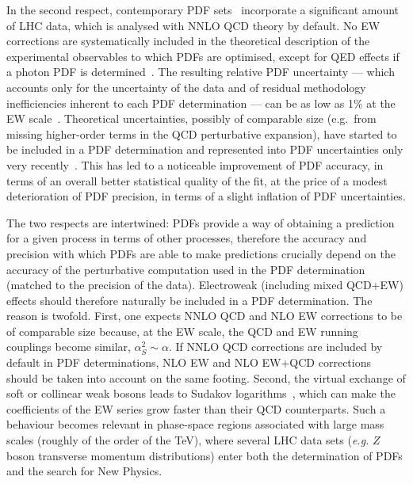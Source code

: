 In the second respect, contemporary PDF
sets~\cite{Harland-Lang:2014zoa,Ball:2017nwa,Hou:2019efy}
incorporate a significant amount of LHC data, which is analysed with NNLO QCD 
theory by default. No EW corrections are systematically included in the 
theoretical description of the experimental observables to which PDFs are 
optimised, except for QED effects if a photon PDF is 
determined~\cite{Schmidt:2015zda,Bertone:2017bme,Harland-Lang:2019pla}. 
The resulting relative PDF uncertainty --- which accounts only for the
uncertainty of the data and of residual methodology inefficiencies inherent to 
each PDF determination --- can be as low as 1\% at the EW 
scale~\cite{Ball:2017nwa}. Theoretical uncertainties, possibly of comparable 
size (e.g.\ from missing higher-order terms in the QCD perturbative
expansion), have started to be included in a PDF determination and represented 
into PDF uncertainties only very 
recently~\cite{AbdulKhalek:2019bux,AbdulKhalek:2019ihb}. This has led to a 
noticeable improvement of PDF accuracy, in terms of an overall
better statistical quality of the fit, at the price of a modest deterioration 
of PDF precision, in terms of a slight inflation of PDF uncertainties.

The two respects are intertwined: PDFs provide a way of obtaining a prediction
for a given process in terms of other processes, therefore the accuracy and 
precision with which PDFs are able to make predictions crucially depend on 
the accuracy of the perturbative computation used in the PDF determination
(matched to the precision of the data). Electroweak (including mixed QCD+EW) 
effects should therefore naturally be included in a PDF determination. The 
reason is twofold. First, one expects NNLO QCD and NLO EW corrections to be of 
comparable size because, at the EW scale, the QCD and EW running couplings 
become similar, $\alpha_S^2\sim \alpha$. If NNLO QCD corrections are included 
by default in PDF determinations, NLO EW and NLO EW+QCD corrections should be 
taken into account on the same footing. Second, the virtual exchange of soft or 
collinear weak bosons leads to Sudakov 
logarithms~\cite{Denner:2000jv,Denner:2001gw},
which can make the coefficients of the EW series grow faster than 
their QCD counterparts. Such a behaviour becomes relevant in
phase-space regions associated with large mass scales (roughly of the order
of the TeV), where several LHC data sets ({\it e.g.} $Z$ boson transverse 
momentum distributions) enter both the determination of PDFs and the search
for New Physics.

